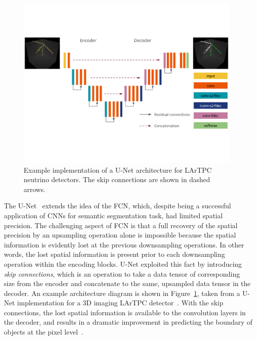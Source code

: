 \documentclass{ws-rv9x6}
\begin{document}
\begin{figure}[t]
    \centering
    \includegraphics[width=0.98\textwidth]{figures/uresnet_architecture.pdf}
    \caption{Example implementation of a U-Net architecture for LArTPC neutrino detectors. The skip connections are shown in dashed arrows.}
    \label{fig:clustering:U-NetArchitecture}
\end{figure}

The U-Net~\cite{ronneberger2015unet} extends the idea of the FCN, which, despite being a successful application of CNNs for semantic segmentation task, had limited spatial precision. The challenging aspect of FCN is that a full recovery of the spatial precision by an upsampling operation alone is impossible because the spatial information is evidently lost at the previous downsampling operations. In other words, the lost spatial information is present prior to each downsampling operation within the encoding blocks. U-Net exploited this fact by introducing {\it skip connections}, which is an operation to take a data tensor of corresponding size from the encoder and concatenate to the same, upsampled data tensor in the decoder.  An example architecture diagram is shown in Figure~\ref{fig:clustering:U-NetArchitecture}, taken from a U-Net implementation for a 3D imaging LArTPC detector~\cite{PhysRevD.102.012005}. With the skip connections, the lost spatial information is available to the convolution layers in the decoder, and results in a dramatic improvement in predicting the boundary of objects at the pixel level~\cite{ronneberger2015unet}.
\end{document}
